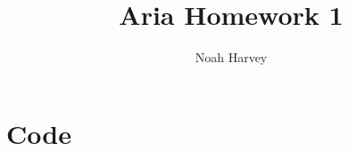 \documentclass{report}
\begin{document}
\title{Aria Homework 1}
\author{Noah Harvey}
\maketitle
\chapter*{Code}

\end{document}
